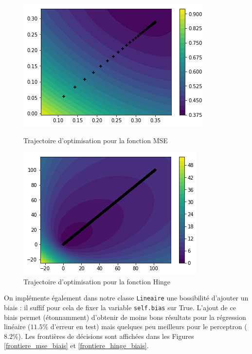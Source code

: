 \documentclass[a4paper]{article}
\begin{document}
\begin{figure}[ht!]
\begin{center}
\begin{minipage}{0.45\textwidth}
\includegraphics[scale=0.5]{trajectoire_mse.png}
\caption{Trajectoire d'optimisation pour la fonction MSE}
\label{trajectoire_mse}
\end{minipage}\hfill
\begin{minipage}{0.45\textwidth}
\includegraphics[scale=0.5]{trajectoire_hinge.png}
\caption{Trajectoire d'optimisation pour la fonction Hinge}
\label{trajectoire_hinge}
\end{minipage}
\end{center}
\end{figure}

On implémente également dans notre classe \verb!Lineaire! une bossibilité d'ajouter un biais : il suffif pour cela de fixer la variable \verb!self.bias! sur True. L'ajout de ce biais permet (étonnamment) d'obtenir de moins bons résultats pour la régression linéaire ($11.5\%$ d'erreur en test) mais quelques peu meilleurs pour le perceptron ($8.2\%$). Les frontières de décisions sont affichées dans les Figures \ref{frontiere_mse_biais} et \ref{frontiere_hinge_biais}.
\end{document}
